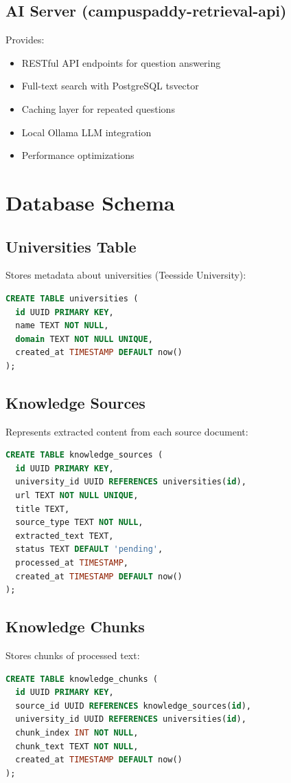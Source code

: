 \documentclass[12pt]{article}
\begin{document}
\subsection{AI Server (campuspaddy-retrieval-api)}

Provides:
\begin{itemize}
    \item RESTful API endpoints for question answering
    \item Full-text search with PostgreSQL tsvector
    \item Caching layer for repeated questions
    \item Local Ollama LLM integration
    \item Performance optimizations
\end{itemize}

\section{Database Schema}

\subsection{Universities Table}
Stores metadata about universities (Teesside University):
\begin{lstlisting}[language=SQL]
CREATE TABLE universities (
  id UUID PRIMARY KEY,
  name TEXT NOT NULL,
  domain TEXT NOT NULL UNIQUE,
  created_at TIMESTAMP DEFAULT now()
);
\end{lstlisting}

\subsection{Knowledge Sources}
Represents extracted content from each source document:
\begin{lstlisting}[language=SQL]
CREATE TABLE knowledge_sources (
  id UUID PRIMARY KEY,
  university_id UUID REFERENCES universities(id),
  url TEXT NOT NULL UNIQUE,
  title TEXT,
  source_type TEXT NOT NULL,
  extracted_text TEXT,
  status TEXT DEFAULT 'pending',
  processed_at TIMESTAMP,
  created_at TIMESTAMP DEFAULT now()
);
\end{lstlisting}

\subsection{Knowledge Chunks}
Stores chunks of processed text:
\begin{lstlisting}[language=SQL]
CREATE TABLE knowledge_chunks (
  id UUID PRIMARY KEY,
  source_id UUID REFERENCES knowledge_sources(id),
  university_id UUID REFERENCES universities(id),
  chunk_index INT NOT NULL,
  chunk_text TEXT NOT NULL,
  created_at TIMESTAMP DEFAULT now()
);
\end{lstlisting}
\end{document}
